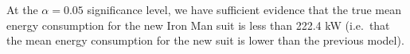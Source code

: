 \documentclass[noanswers]{exam}
\begin{document}
\begin{questions}
\begin{parts}
\begin{solution}[\stretch{1}]

\vspace{3mm}

At the $\alpha=0.05$ significance level, we have sufficient evidence that the true mean energy consumption for the new Iron Man suit is less than 222.4 kW (i.e.\ that the mean energy consumption for the new suit is lower than the previous model). 

\vspace{3mm}

\end{solution}

\end{parts}


\end{questions}




\end{document}
